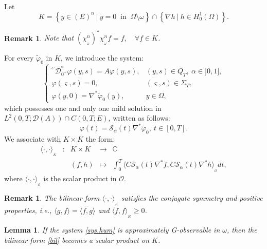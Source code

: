 \documentclass{article}
\newtheorem{lemma}[theorem]{Lemma}
\newtheorem{remark}[theorem]{Remark}
\begin{document}
Let 
$$
K = \left\{ y\in \left(E\right)^n \ | \ y = 0 \ \text{ in } \ 
\Omega\setminus \omega \right\}\cap\left\{\nabla h \ |
\ h\in H^1_0(\Omega)\right\}.
$$

\begin{remark}
\label{rk2}
Note that $(\chi_{_\omega}^{n})^*\chi_{_\omega}^{n}f 
= f , \quad \forall f\in K$.
\end{remark}

For every $\tilde{\varphi}_0$ in $K$, we introduce the system:
\begin{equation}
\label{sys.hum}
\left\{\begin{array}{llll}
^{^C}\mathcal{D}_{0^+}^{^\alpha}\varphi(y,s) 
=  A\varphi(y,s),  & (y,s)\in Q_T, \ \alpha\in]0,1], \\ 
\varphi(\varsigma,s) = 0,  & (\varsigma,s)\in \Sigma_T, \\
\varphi(y,0) = \nabla^*\tilde{\varphi}_0(y), & y\in\Omega,
\end{array}\right.
\end{equation} 
which possesses one and only one mild solution in 
$L^2(0,T;\mathcal{D}(A))\cap C(0,T;E)$, written as follows:
\begin{equation}
\label{sol.sys.hum}
\varphi(t) =  \mathcal{S}_\alpha(t)\nabla^*\tilde{\varphi}_0, \ t\in [0,T].
\end{equation}
We associate with $K\times K$ the form:
\begin{equation}
\label{bil}
\begin{array}{lllll}
\langle \cdot, \cdot\rangle_{_K} & : & K\times K 
& \longrightarrow & \mathbb{C}\\
& & (f,h)& \longmapsto & \displaystyle 
\int_{0}^{T}\langle C\mathcal{S}_\alpha(t)\nabla^*f,
C\mathcal{S}_\alpha(t)\nabla^*h\rangle_{_\mathcal{O}}dt,
\end{array}
\end{equation} 
where $\langle \cdot, \cdot \rangle_{_\mathcal{O}}$ 
is the scalar product in $\mathcal{O}$.

\begin{remark}
\label{rq}
The bilinear form $\langle \cdot,\cdot \rangle_{_K}$ satisfies the conjugate 
symmetry and positive properties, i.e., 
$\langle g,f \rangle =\overline{\langle f,g \rangle}$
and $\langle f,f \rangle_{_K} \geq 0$.
\end{remark}

\begin{lemma}
\label{lemma.prod}
If the system \eqref{sys.hum} is approximately G-observable in $\omega$, 
then the bilinear form \eqref{bil} becomes a scalar product on $K$.
\end{lemma}
\end{document}
